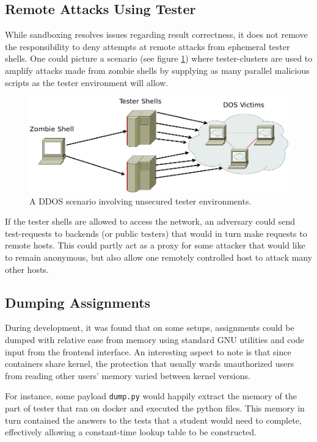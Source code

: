 \subsection{Remote Attacks Using Tester}
While sandboxing resolves issues regarding result correctness, it does not remove the responsibility to deny attempts at remote attacks from ephemeral tester shells. One could picture a scenario (see figure \ref{fig:tester-ddos}) where tester-clusters are used to amplify attacks made from zombie shells by supplying as many parallel malicious scripts as the tester environment will allow.
\begin{figure}[ht]
    \centering
    \includegraphics[width=\textwidth]{img/tester_amplification.png}
    \caption{A DDOS scenario involving unsecured tester environments.}\label{fig:tester-ddos}
\end{figure}
If the tester shells are allowed to access the network, an adversary could send test-requests to backends (or public testers) that would in turn make requests to remote hosts. This could partly act as a proxy for some attacker that would like to remain anonymous, but also allow one remotely controlled host to attack many other hosts.

\subsection{Dumping Assignments}
During development, it was found that on some setups, assignments could be dumped with relative ease from memory using standard GNU utilities and code input from the frontend interface. An interesting aspect to note is that since containers share kernel, the protection that usually wards unauthorized users from reading other users' memory varied between kernel versions.

For instance, some payload \texttt{dump.py} would happily extract the memory of the part of tester that ran on docker and executed the python files. This memory in turn contained the answers to the tests that a student would need to complete, effectively allowing a constant-time lookup table to be constructed.


